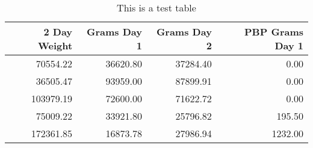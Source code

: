 \begin{table}[h]
\caption{This is a test table}
\label{test_table}
\begin{tabular}{rrrr}
\toprule
2 Day Weight & Grams Day 1 & Grams Day 2 & PBP Grams Day 1 \\
\midrule
70554.22 & 36620.80 & 37284.40 & 0.00 \\
36505.47 & 93959.00 & 87899.91 & 0.00 \\
103979.19 & 72600.00 & 71622.72 & 0.00 \\
75009.22 & 33921.80 & 25796.82 & 195.50 \\
172361.85 & 16873.78 & 27986.94 & 1232.00 \\
\bottomrule
\end{tabular}
\end{table}
